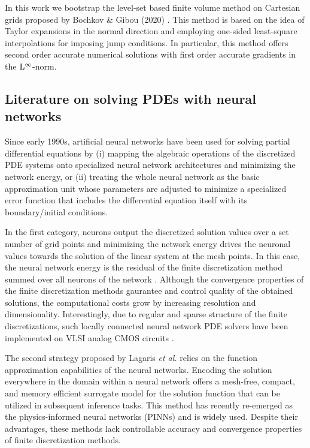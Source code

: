\documentclass{elsarticle}
\begin{document}
In this work we bootstrap the level-set based finite volume method on Cartesian grids proposed by Bochkov \& Gibou (2020) \cite{BOCHKOV2020109269}. This method is based on the idea of Taylor expansions in the normal direction and employing one-sided least-square interpolations for imposing jump conditions. In particular, this method offers second order accurate numerical solutions with first order accurate gradients in the $\rm L^\infty$-norm.


\subsection{Literature on solving PDEs with neural networks}
Since early 1990s, artificial neural networks have been used for solving partial differential equations by (i) mapping the algebraic operations of the discretized PDE systems onto specialized neural network architectures and minimizing the network energy, or (ii) treating the whole neural network as the basic approximation unit whose parameters are adjusted to minimize a specialized error function that includes the differential equation itself with its boundary/initial conditions. 


In the first category, neurons output the discretized solution values over a set number of grid points and minimizing the network energy drives the neuronal values towards the solution of the linear system at the mesh points. In this case, the neural network energy is the residual of the finite discretization method summed over all neurons of the network \cite{lee1990neural}. Although the convergence properties of the finite discretization methods gaurantee and control quality of the obtained solutions, the computational costs grow by increasing resolution and dimensionality. Interestingly, due to regular and sparse structure of the finite discretizations, such locally connected neural network PDE solvers have been implemented on VLSI analog CMOS circuits \cite{gobovic1993design,chua1988cellular,chua1988cellularA}.


The second strategy proposed by Lagaris \textit{et al.} \cite{lagaris1998artificial} relies on the function approximation capabilities of the neural networks. Encoding the solution everywhere in the domain within a neural network offers a mesh-free, compact, and memory efficient surrogate model for the solution function that can be utilized in subsequent inference tasks. This method has recently re-emerged as the physics-informed neural networks (PINNs) \cite{RAISSI2019686} and is widely used. Despite their advantages, these methods lack controllable accuracy and convergence properties of finite discretization methods.
\end{document}

